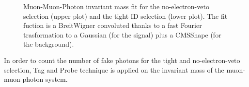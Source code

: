 \documentclass[12pt,oneandhalf,chaparabic,phys,ms,eng]{metu}
\begin{document}
\begin{figure}[!ht]
  \begin{center}
  \end{center}
    \caption{Muon-Muon-Photon invariant mass fit for the no-electron-veto selection (upper plot) and the tight ID selection (lower plot). The fit fuction is a BreitWigner convoluted thanks to a fast Fourier trasformation to a 
Gaussian (for the signal) plus a CMSShape (for the background).}
    \label{Zmass_signal}
\end{figure}

In order to count the number of fake photons for the tight and no-electron-veto selection, Tag and Probe technique is applied on the invariant mass of the muon-muon-photon system. 
\end{document}
